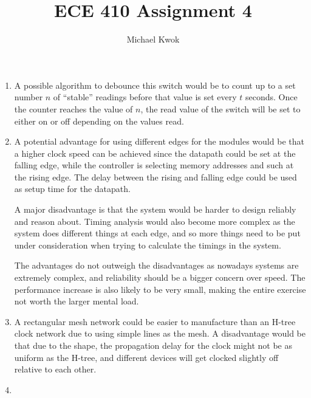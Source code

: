 \documentclass{article}
\title{ECE 410 Assignment 4}
\author{Michael Kwok}
\begin{document}
\maketitle

\begin{enumerate}
  \item A possible algorithm to debounce this switch would be to count up to a set number \(n\) of ``stable'' readings before that value is set every \(t\) seconds. Once the counter reaches the value of \(n\), the read value of the switch will be set to either on or off depending on the values read.
   
  \item A potential advantage for using different edges for the modules would be that a higher clock speed can be achieved since the datapath could be set at the falling edge, while the controller is selecting memory addresses and such at the rising edge. The delay between the rising and falling edge could be used as setup time for the datapath.
  
  A major disadvantage is that the system would be harder to design reliably and reason about. Timing analysis would also become more complex as the system does different things at each edge, and so more things need to be put under consideration when trying to calculate the timings in the system.

  The advantages do not outweigh the disadvantages as nowadays systems are extremely complex, and reliability should be a bigger concern over speed. The performance increase is also likely to be very small, making the entire exercise not worth the larger mental load.

  \item A rectangular mesh network could be easier to manufacture than an H-tree clock network due to using simple lines as the mesh. A disadvantage would be that due to the shape, the propagation delay for the clock might not be as uniform as the H-tree, and different devices will get clocked slightly off relative to each other.
  
  \item
\end{enumerate}
\end{document}
